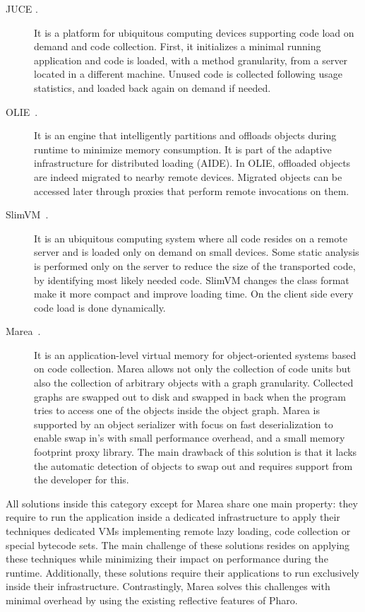 \begin{description}
\item[JUCE \cite{Popa04a,Teod01a}.] It is a platform for ubiquitous computing devices supporting code load on demand and code collection. First, it initializes a minimal running application and code is loaded, with a method granularity, from a server located in a different machine. Unused code is collected following usage statistics, and loaded back again on demand if needed.

\item[OLIE~\cite{Gu03a}.] It is an engine that intelligently partitions and offloads objects during runtime to minimize memory consumption. It is part of the adaptive infrastructure for distributed loading (AIDE). In OLIE, offloaded objects are indeed migrated to nearby remote devices. Migrated objects can be accessed later through proxies that perform remote invocations on them.

\item[SlimVM~\cite{Kers09a, Wagn11a}.] It is an ubiquitous computing system where all code resides on a remote server and is loaded only on demand on small devices. Some static analysis is performed only on the server to reduce the size of the transported code, by identifying most likely needed code. SlimVM changes the class format make it more compact and improve loading time. On the client side every code load is done dynamically.

\item[Marea~\cite{Mart12a}.] It is an application-level virtual memory for object-oriented systems based on code collection. Marea allows not only the collection of code units but also the collection of arbitrary objects with a graph granularity. Collected graphs are swapped out to disk and swapped in back when the program tries to access one of the objects inside the object graph. Marea is supported by an object serializer with focus on fast deserialization to enable swap in's with small performance overhead, and a small memory footprint proxy library. The main drawback of this solution is that it lacks the automatic detection of objects to swap out and requires support from the developer for this.

\end{description}

All solutions inside this category except for Marea share one main property: they require to run the application inside a dedicated infrastructure to apply their techniques \eg dedicated VMs implementing remote lazy loading, code collection or special bytecode sets. The main challenge of these solutions resides on applying these techniques while minimizing their impact on performance during the runtime. Additionally, these solutions require their applications to run exclusively inside their infrastructure. Contrastingly, Marea solves this challenges with minimal overhead by using the existing reflective features of Pharo.

